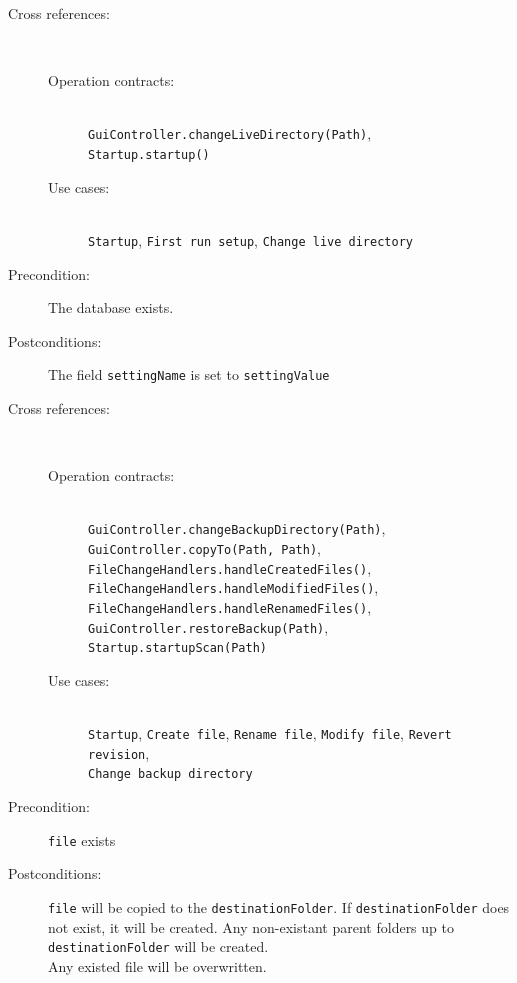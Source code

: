 \documentclass[12pt,a4paper]{article}
\begin{document}
\begin{description}
	\item[Cross references:] \hfill \vspace{-4ex}  \\
		\begin{description} 
		\item[Operation contracts:] \hfill \\
			\texttt{GuiController.changeLiveDirectory(Path)},\\
			\texttt{Startup.startup()}
		\item[Use cases:] \hfill \\
			\texttt{Startup}, \texttt{First run setup}, \texttt{Change live directory}
	\end{description}
	\item[Precondition:] The database exists.
	\item[Postconditions:] The field \texttt{settingName} is set to \texttt{settingValue}
\end{description}

\vspace{0.75cm}

\begin{description}
	\item[Cross references:] \hfill \vspace{-4ex}  \\
		\begin{description} 
		\item[Operation contracts:] \hfill \\
			\texttt{GuiController.changeBackupDirectory(Path)},\\
			\texttt{GuiController.copyTo(Path, Path)},\\
			\texttt{FileChangeHandlers.handleCreatedFiles()}, \\
			\texttt{FileChangeHandlers.handleModifiedFiles()}, \\
			\texttt{FileChangeHandlers.handleRenamedFiles()},\\
			\texttt{GuiController.restoreBackup(Path)},\\
			\texttt{Startup.startupScan(Path)}
		\item[Use cases:] \hfill \\
			\texttt{Startup}, \texttt{Create file}, \texttt{Rename file},
			\texttt{Modify file}, \texttt{Revert revision},\\
			\texttt{Change backup directory}
	\end{description} 	      
	\item[Precondition:] \texttt{file} exists
	\item[Postconditions:] \texttt{file} will be copied to the \texttt{destinationFolder}. If \texttt{destinationFolder} does not exist, it will be created. Any non-existant parent folders up to \texttt{destinationFolder} will be created.\\
	Any existed file will be overwritten.
\end{description}
\end{document}
